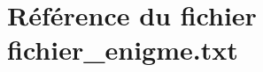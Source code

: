 \hypertarget{fichier__enigme_8txt}{}\section{Référence du fichier fichier\+\_\+enigme.\+txt}
\label{fichier__enigme_8txt}

